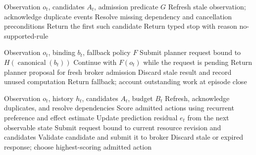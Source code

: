 \begin{algorithm}[H]\caption{Ordered guarded selection with broker-admitted candidates}\label{alg:guarded}
\begin{algorithmic}[1]\Require Observation $o_t$, candidates $A_t$, admission predicate $G$
\State Refresh stale observation; acknowledge duplicate events
\State Resolve missing dependency and cancellation preconditions
    \State Return the first such candidate
  \EndIf
\EndFor
\State Return typed stop with reason no-supported-rule
\end{algorithmic}\end{algorithm}
\begin{algorithm}[H]\caption{Asynchronous planning with binding validation and fallback accounting}\label{alg:async}
\begin{algorithmic}[1]\Require Observation $o_t$, binding $b_t$, fallback policy $F$
  \State Submit planner request bound to $H(\operatorname{canonical}(b_t))$
\EndIf
\State Continue with $F(o_t)$ while the request is pending
    \State Return planner proposal for fresh broker admission
  \Else
    \State Discard stale result and record unused computation
  \EndIf
\EndIf
\State Return fallback; account outstanding work at episode close
\end{algorithmic}\end{algorithm}
\begin{algorithm}[H]\caption{Resource-versioned metacontrol and stale-response handling}\label{alg:m12}
\begin{algorithmic}[1]\Require Observation $o_t$, history $h_t$, candidates $A_t$, budget $B_t$
\State Refresh, acknowledge duplicates, and resolve dependencies
\State Score admitted actions using recurrent preference and effect estimate
\State Update prediction residual $e_t$ from the next observable state
    \State Submit request bound to current resource revision and candidates
  \EndIf
\EndIf
{}
  \State Validate candidate and submit it to broker
\Else
  \State Discard stale or expired response; choose highest-scoring admitted action
\EndIf
\end{algorithmic}\end{algorithm}

